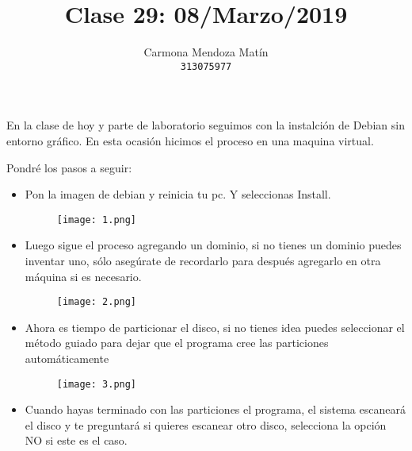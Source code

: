 \documentclass[11pt, a4paper]{report}
\begin{document}
\title{Clase 29: 08/Marzo/2019}
\author{
  Carmona Mendoza Mat\'in\\
  \texttt{313075977}
}
\date{}
\maketitle

En la clase de hoy y parte de laboratorio seguimos con la instalción de Debian
sin entorno gráfico. En esta ocasión hicimos el proceso en una maquina virtual.

Pondré los pasos a seguir:

\begin{itemize}
\item Pon la imagen de debian y reinicia tu pc. Y seleccionas Install.

  \begin{figure}[!ht] 
    \begin{center}  
      \texttt{[image: 1.png]} 
      \caption{} 
    \end{center} 
  \end{figure} 

\item Luego sigue el proceso agregando un dominio, si no tienes un dominio
  puedes inventar uno, sólo asegúrate de recordarlo para después agregarlo en
  otra máquina si es necesario.

  \begin{figure}[!ht] 
    \begin{center}  
      \texttt{[image: 2.png]} 
      \caption{} 
    \end{center} 
  \end{figure}
  
\item Ahora es tiempo de particionar el disco, si no tienes idea puedes
  seleccionar el método guiado para dejar que el programa cree las particiones
  automáticamente

  \begin{figure}[!ht] 
    \begin{center}  
      \texttt{[image: 3.png]} 
      \caption{} 
    \end{center} 
  \end{figure}
  
\item Cuando hayas terminado con las particiones el programa, el sistema
  escaneará el disco y te preguntará si quieres escanear otro disco, selecciona
  la opción NO si este es el caso.
  

\end{itemize}
\end{document}
